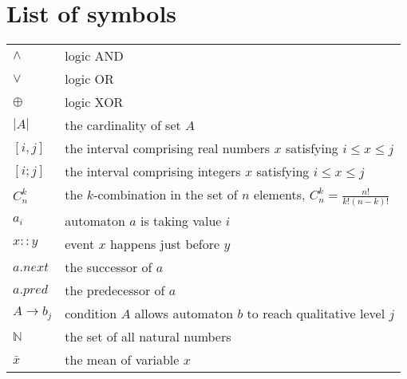 \documentclass[11pt,twoside,openright]{report}
\theoremstyle{definition}
\newcommand{\roux}[2]{{\sout{#1}}{{\color{purple}~#2}}} %
\begin{document}
\begin{abstract}
Le chapitre~\ref{chap:modelInference} pr\'esente la m\'ethodologie de l'apprentissage par mod\`ele.
Nos syst\`emes de construction de mod\`eles par apprentissage %
 CRAC et M2RIT effectuent en fait une s\'election des mod\`eles.
Ils choisissent un mod\`ele parmi les candidats qui satisfont \`a toutes les contraintes d'accessibilit\'e donn\'ees.
Cependant, le nombre de mod\`eles candidats pouvant \^etre de tr\`es grande taille, %
 nos r\'eviseurs de mod\`eles peuvent r\'eduire l'espace de recherche avec des contraintes lors de la g\'en\'eration des mod\`eles.

Le chapitre~\ref{chap:test} pr\'esente quelques tests comparatifs et exploratoires et leurs r\'esultats sur les m\'ethodes pr\'esent\'ees aux chapitres~\ref{chap:refinement} et \ref{chap:modelInference}.
PermReach et ASPReach sont plus efficaces que les v\'erificateurs de mod\`ele traditionnels pour l'analyse de l'accessibilit\'e. Ils effectuent une analyse plus concluante tout en maintenant la dur\'ee de fonctionnement \`a la m\^eme \'echelle que les analyseurs statiques purs.

Le chapitre~\ref{chap:conclusion} conclut la th\`ese et propose des travaux futurs possibles.
\end{abstract}

\chapter*{List of symbols}
\begin{tabular}{l|l}
    $\land$ & logic AND\\
    $\lor$ & logic OR\\
    $\oplus$ & logic XOR\\
    $|A|$ & the cardinality of set $A$\\
    $[i,j]$& the interval comprising real numbers $x$ satisfying $i\leq x\leq j$\\
    $[i;j]$& the interval comprising integers $x$ satisfying $i\leq x\leq j$\\
    $C_n^k$& the $k$-combination in the set of $n$ elements, $C_n^k=\frac {n!}{k!(n-k)!}$\\
    $a_i$  & automaton $a$ is taking value $i$ \\
    $x::y$ & event $x$ happens just before $y$\\
    $a.next$&the successor of $a$\\
    $a.pred$ & the predecessor of $a$\\
    $A\to b_j$ & condition $A$ allows automaton $b$ to reach qualitative level $j$\\
    $\mathbb{N}$ & the set of all natural numbers\\
    $\bar{x}$ & the mean of variable $x$
\end{tabular}
\end{document}
